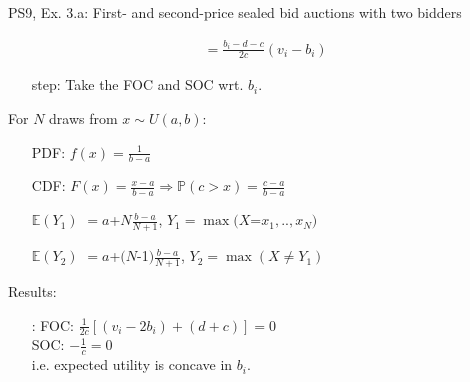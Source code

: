 \begin{frame}{PS9, Ex. 3.a: First- and second-price sealed bid auctions with two bidders}
\begin{multicols}{2}
\begin{align*}
                                &=\frac{b_i-d-c}{2c}(v_i-b_i)
      \end{align*}
      \vspace{-10pt}
      \begin{itemize}
        \item[\nth{2} step:] Take the FOC and SOC wrt. $b_i$.
      \end{itemize}
      \vfill\null\columnbreak
      For $N$ draws from $x\sim U(a, b):$
      \vspace{-6pt}
      \begin{enumerate}
        \item[PDF:] $f(x)=\frac{1}{b-a}$
        \item[CDF:] $F(x)=\frac{x-a}{b-a}\Rightarrow\mathbb{P}(c>x)=\frac{c-a}{b-a}$
        \item[$\mathbb{E}(Y_1)$] $=a$+$N\frac{b-a}{N+1}$, $Y_1=\max(X$=$x_1,..,x_N)$
        \item[$\mathbb{E}(Y_2)$] $=a$+$(N$-1$)\frac{b-a}{N+1}$, $Y_2=\max(X\neq Y_1)$
      \end{enumerate}
      \vspace{-6pt}
      Results:
      \vspace{-6pt}
      \begin{itemize}
        \item[\nth{2}:] FOC: $\frac{1}{2c}[(v_i-2b_i)+(d+c)]=0$\\
                        SOC: $-\frac{1}{c}=0$\\
                        i.e. expected utility is concave in $b_i$.
      \end{itemize}
      \vfill\null
    \end{multicols}
\end{frame}
